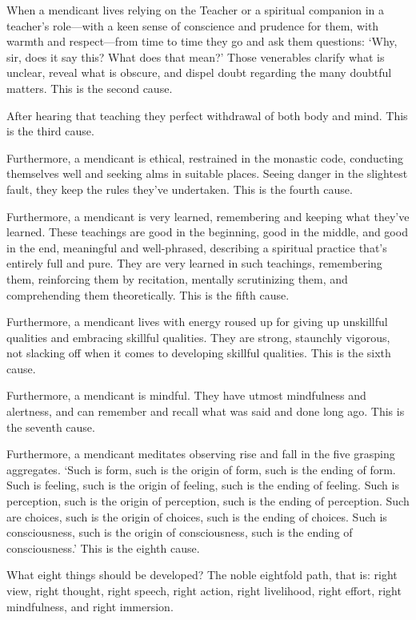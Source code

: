 \documentclass[12pt,openany]{book}%
\begin{document}
When a mendicant lives relying on the Teacher or a spiritual companion in a teacher’s role—with a keen sense of conscience and prudence for them, with warmth and respect—from time to time they go and ask them questions: ‘Why, sir, does it say this? What does that mean?’ Those venerables clarify what is unclear, reveal what is obscure, and dispel doubt regarding the many doubtful matters. This is the second cause. 

After hearing that teaching they perfect withdrawal of both body and mind. This is the third cause. 

Furthermore, a mendicant is ethical, restrained in the monastic code, conducting themselves well and seeking alms in suitable places. Seeing danger in the slightest fault, they keep the rules they’ve undertaken. This is the fourth cause. 

Furthermore, a mendicant is very learned, remembering and keeping what they’ve learned. These teachings are good in the beginning, good in the middle, and good in the end, meaningful and well-phrased, describing a spiritual practice that’s entirely full and pure. They are very learned in such teachings, remembering them, reinforcing them by recitation, mentally scrutinizing them, and comprehending them theoretically. This is the fifth cause. 

Furthermore, a mendicant lives with energy roused up for giving up unskillful qualities and embracing skillful qualities. They are strong, staunchly vigorous, not slacking off when it comes to developing skillful qualities. This is the sixth cause. 

Furthermore, a mendicant is mindful. They have utmost mindfulness and alertness, and can remember and recall what was said and done long ago. This is the seventh cause. 

Furthermore, a mendicant meditates observing rise and fall in the five grasping aggregates. ‘Such is form, such is the origin of form, such is the ending of form. Such is feeling, such is the origin of feeling, such is the ending of feeling. Such is perception, such is the origin of perception, such is the ending of perception. Such are choices, such is the origin of choices, such is the ending of choices. Such is consciousness, such is the origin of consciousness, such is the ending of consciousness.’ This is the eighth cause. 

What eight things should be developed? The noble eightfold path, that is: right view, right thought, right speech, right action, right livelihood, right effort, right mindfulness, and right immersion. 
\end{document}
